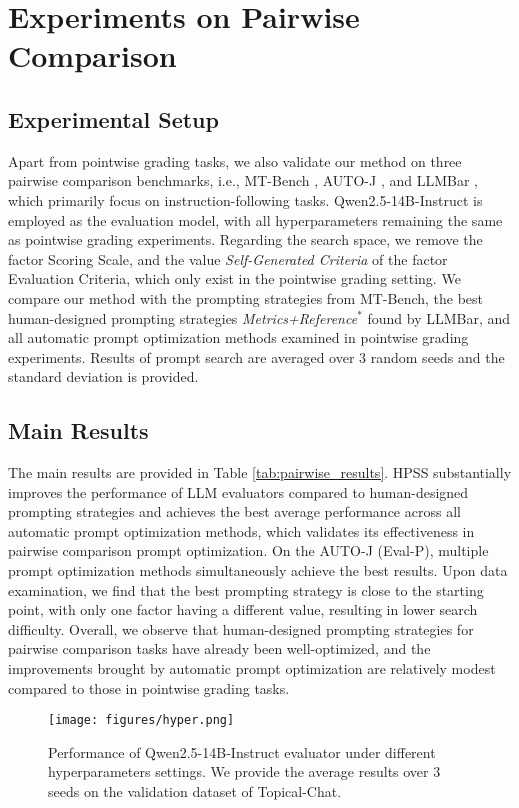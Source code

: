 \section{Experiments on Pairwise Comparison}
\label{appendix:pairwise}
\subsection{Experimental Setup}
Apart from pointwise grading tasks, we also validate our method on three pairwise comparison benchmarks, i.e., MT-Bench \cite{zheng2023judging}, AUTO-J \cite{li2024generative}, and LLMBar \cite{zeng2024llmbar}, which primarily focus on instruction-following tasks.
Qwen2.5-14B-Instruct is employed as the evaluation model, with all hyperparameters remaining the same as pointwise grading experiments. 
Regarding the search space, we remove the factor Scoring Scale, and the value \textit{Self-Generated Criteria} of the factor Evaluation Criteria, which only exist in the pointwise grading setting. 
We compare our method with the prompting strategies from MT-Bench, the best human-designed prompting strategies \textit{Metrics+Reference$^*$} found by LLMBar, and all automatic prompt optimization methods examined in pointwise grading experiments.
Results of prompt search are averaged over 3 random seeds and the standard deviation is provided.
\subsection{Main Results}
The main results are provided in Table \ref{tab:pairwise_results}.
HPSS substantially improves the performance of LLM evaluators compared to human-designed prompting strategies and achieves the best average performance across all automatic prompt optimization methods, which validates its effectiveness in pairwise comparison prompt optimization.
On the AUTO-J (Eval-P), multiple prompt optimization methods simultaneously achieve the best results.
Upon data examination, we find that %
the best prompting strategy is close to the starting point, with only one factor having a different value, resulting in lower search difficulty. 
Overall, we observe that human-designed prompting strategies for pairwise comparison tasks have already been well-optimized, and the improvements brought by automatic prompt optimization are relatively modest compared to those in pointwise grading tasks.




\begin{figure*}[!h]
\scriptsize
    \centering
    \texttt{[image: figures/hyper.png]}
    \vspace{-4mm}
    \caption{Performance of Qwen2.5-14B-Instruct evaluator under different hyperparameters settings. 
    We provide the average results over 3 seeds on the validation dataset of Topical-Chat.}
    \label{fig:hyper}
\end{figure*}
